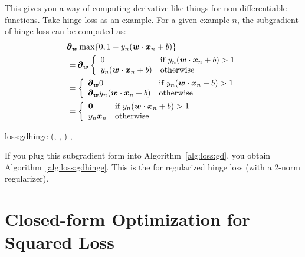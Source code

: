 This gives you a way of computing derivative-like things for
non-differentiable functions.  Take hinge loss as an example.  For a
given example $n$, the subgradient of hinge loss can be computed as:
%
\begin{align}
&\pmb\partial_{\boldsymbol{w}} \max \{ 0, 1 - y_n ( {\boldsymbol{w}} \cdot {\boldsymbol{x}}_n+b ) \} \\
&= \pmb\partial_{\boldsymbol{w}} \left\{\begin{array}{ll} 0 & \text{if } y_n ( {\boldsymbol{w}} \cdot {\boldsymbol{x}}_n+b ) > 1 \\
                        y_n ( {\boldsymbol{w}} \cdot {\boldsymbol{x}}_n+b )  & \text{otherwise}\end{array}\right.\\
&= \left\{\begin{array}{ll} \pmb\partial_{\boldsymbol{w}} 0 & \text{if } y_n ( {\boldsymbol{w}} \cdot {\boldsymbol{x}}_n+b ) > 1 \\
           \pmb\partial_{\boldsymbol{w}} y_n ( {\boldsymbol{w}} \cdot {\boldsymbol{x}}_n+b )  & \text{otherwise}\end{array}\right.\\
&= \left\{\begin{array}{ll} \boldsymbol{0} & \text{if } y_n ( {\boldsymbol{w}} \cdot {\boldsymbol{x}}_n+b ) > 1 \\
           y_n {\boldsymbol{x}}_n  & \text{otherwise}\end{array}\right.
\end{align}

\newalgorithm%
  {loss:gdhinge}%
  {(, \VAR{$\la$}, )}
  {
\ENDIF
\ENDFOR
\SETST{$\vg$}{$\VARm{\vg} - \VARm{\la} \VARm{\vw}$}
\SETST{$\vw$}{$\VARm{\vw} + \VARm{\eta} \VARm{\vg}$}
\ENDFOR
\RETURN \VAR{$\vw$}, 
}

If you plug this subgradient form into Algorithm~\ref{alg:loss:gd},
you obtain Algorithm~\ref{alg:loss:gdhinge}.  This is the
 for regularized hinge loss (with a
$2$-norm regularizer).


\section{Closed-form Optimization for Squared Loss}
\label{sec:loss:reg}


